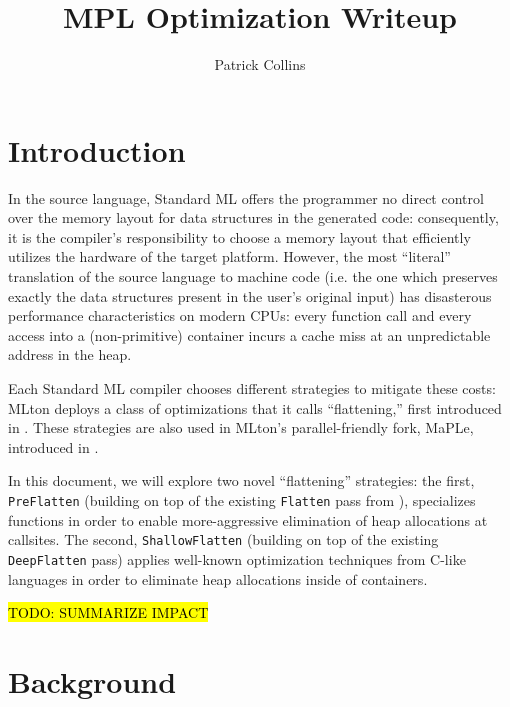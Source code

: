 \documentclass[leqno,11pt]{article}
\begin{document}
\title{MPL Optimization Writeup}
\author{Patrick Collins}
\maketitle

\tableofcontents

\section{Introduction}

In the source language, Standard ML offers the programmer no direct control over
the memory layout for data structures in the generated code: consequently, it is
the compiler's responsibility to choose a memory layout that efficiently
utilizes the hardware of the target platform. However, the most ``literal''
translation of the source language to machine code (i.e. the one which preserves
exactly the data structures present in the user's original input) has
disasterous performance characteristics on modern CPUs: every function call and
every access into a (non-primitive) container incurs a cache miss at an
unpredictable address in the heap.

Each Standard ML compiler chooses different strategies to mitigate these costs:
MLton \cite{mlton-website} deploys a class of optimizations that it calls
``flattening,'' first introduced in \cite{flat-paper}. These strategies are also
used in MLton's parallel-friendly fork, MaPLe, introduced in \cite{mpl-orig}.

In this document, we will explore two novel ``flattening'' strategies: the
first, \texttt{PreFlatten} (building on top of the existing \texttt{Flatten}
pass from \cite{flat-paper}), specializes functions in order to enable
more-aggressive elimination of heap allocations at callsites. The second,
\texttt{ShallowFlatten} (building on top of the existing \texttt{DeepFlatten}
pass) applies well-known optimization techniques from C-like languages in order
to eliminate heap allocations inside of containers.

\hl{TODO: SUMMARIZE IMPACT}



\section{Background}
\end{document}
